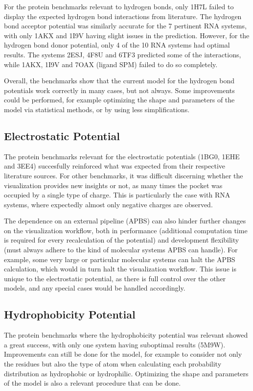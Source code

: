     For the protein benchmarks relevant to hydrogen bonds, only 1H7L failed to display the expected hydrogen bond interactions from literature. The hydrogen bond acceptor potential was similarly accurate for the 7 pertinent RNA systems, with only 1AKX and 1I9V having slight issues in the prediction. However, for the hydrogen bond donor potential, only 4 of the 10 RNA systems had optimal results. The systems 2ESJ, 4F8U and 6TF3 predicted some of the interactions, while 1AKX, 1I9V and 7OAX (ligand SPM) failed to do so completely.

    Overall, the benchmarks show that the current model for the hydrogen bond potentials work correctly in many cases, but not always. Some improvements could be performed, for example optimizing the shape and parameters of the model via statistical methods, or by using less simplifications.

  \subsection{Electrostatic Potential}
    The protein benchmarks relevant for the electrostatic potentials (1BG0, 1EHE and 3EE4) succesfully reinforced what was expected from their respective literature sources. For other benchmarks, it was difficult discerning whether the visualization provides new insights or not, as many times the pocket was occupied by a single type of charge. This is particularly the case with RNA systems, where expectedly almost only negative charges are observed.

    The dependence on an external pipeline (APBS) can also hinder further changes on the visualization workflow, both in performance (additional computation time is required for every recalculation of the potential) and development flexibility (must always adhere to the kind of molecular systems APBS can handle). For example, some very large or particular molecular systems can halt the APBS calculation, which would in turn halt the visualization workflow. This issue is unique to the electrostatic potential, as there is full control over the other models, and any special cases would be handled accordingly.

  \subsection{Hydrophobicity Potential}
    The protein benchmarks where the hydrophobicity potential was relevant showed a great success, with only one system having suboptimal results (5M9W). Improvements can still be done for the model, for example to consider not only the residues but also the type of atom when calculating each probability distribution as hydrophobic or hydrophilic. Optimizing the shape and parameters of the model is also a relevant procedure that can be done.


